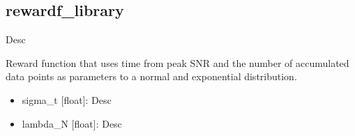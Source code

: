 \documentclass[letterpaper,10pt,english]{sphinxmanual}
\begin{document}
\subsection{rewardf\_library}
\label{\detokenize{modules/rewardf_library:module-rewardf_library}}\label{\detokenize{modules/rewardf_library:rewardf-library}}\label{\detokenize{modules/rewardf_library::doc}}

\begin{fulllineitems}
\label{\detokenize{modules/rewardf_library:rewardf_library.rewardf_TEMPLATE}}
\end{fulllineitems}


\begin{fulllineitems}
\label{\detokenize{modules/rewardf_library:rewardf_library.rewardf_exp_peak_SNR}}
Desc

\end{fulllineitems}


\begin{fulllineitems}
\label{\detokenize{modules/rewardf_library:rewardf_library.rewardf_exp_peak_SNR_tracklet_len}}
Reward function that uses time from peak SNR and the number of accumulated data points as parameters to a normal and exponential distribution.

\begin{itemize}
\item {} 
sigma\_t {[}float{]}: Desc

\item {} 
lambda\_N {[}float{]}: Desc

\end{itemize}

\end{fulllineitems}
\end{document}
